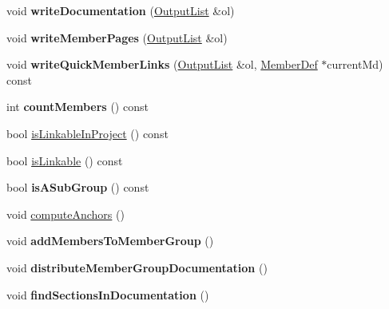 \begin{DoxyCompactItemize}
\item 
\hypertarget{class_group_def_a0c85f3695c99f7b1aeb762bbdabc8d62}{void {\bfseries write\-Documentation} (\hyperlink{class_output_list}{Output\-List} \&ol)}\label{class_group_def_a0c85f3695c99f7b1aeb762bbdabc8d62}

\item 
\hypertarget{class_group_def_a3ab9294ac3e907a42b200665010f9381}{void {\bfseries write\-Member\-Pages} (\hyperlink{class_output_list}{Output\-List} \&ol)}\label{class_group_def_a3ab9294ac3e907a42b200665010f9381}

\item 
\hypertarget{class_group_def_a17f78962f99b43ea249eb44b0ae0a8d2}{void {\bfseries write\-Quick\-Member\-Links} (\hyperlink{class_output_list}{Output\-List} \&ol, \hyperlink{class_member_def}{Member\-Def} $\ast$current\-Md) const }\label{class_group_def_a17f78962f99b43ea249eb44b0ae0a8d2}

\item 
\hypertarget{class_group_def_a468d850088059ac3c439ff21c13a4d21}{int {\bfseries count\-Members} () const }\label{class_group_def_a468d850088059ac3c439ff21c13a4d21}

\item 
bool \hyperlink{class_group_def_a7ff00a84da6e47f3c64c6bf9f6316385}{is\-Linkable\-In\-Project} () const 
\item 
bool \hyperlink{class_group_def_afb5645c0dc69c2f1da67da6e33316e3b}{is\-Linkable} () const 
\item 
\hypertarget{class_group_def_a3f5c7adcad4202cdf75d47240c3796a7}{bool {\bfseries is\-A\-Sub\-Group} () const }\label{class_group_def_a3f5c7adcad4202cdf75d47240c3796a7}

\item 
void \hyperlink{class_group_def_a6bd971b93180dba29a797a5472362d17}{compute\-Anchors} ()
\item 
\hypertarget{class_group_def_ab9b8dfbf4b834e7f3e6557537a877ed9}{void {\bfseries add\-Members\-To\-Member\-Group} ()}\label{class_group_def_ab9b8dfbf4b834e7f3e6557537a877ed9}

\item 
\hypertarget{class_group_def_a2422e453d341daa281687fb6a4e7b76f}{void {\bfseries distribute\-Member\-Group\-Documentation} ()}\label{class_group_def_a2422e453d341daa281687fb6a4e7b76f}

\item 
\hypertarget{class_group_def_ad714b0e193e95efc23bb5de8dfb76cb6}{void {\bfseries find\-Sections\-In\-Documentation} ()}\label{class_group_def_ad714b0e193e95efc23bb5de8dfb76cb6}


\end{DoxyCompactItemize}
